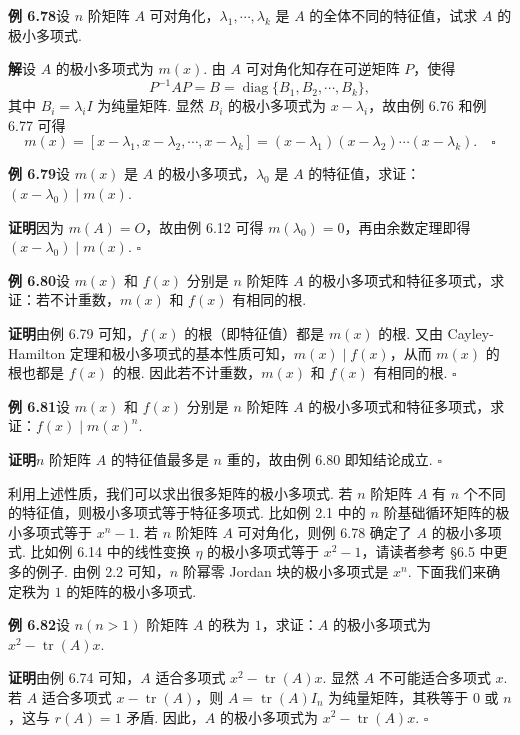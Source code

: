 \documentclass[UTF8, 12pt, fontset=fandol, oneside]{ctexart}
\begin{document}
\noindent\textbf{例 6.78}\quad 设 $n$ 阶矩阵 $A$ 可对角化，$\lambda_1,\cdots,\lambda_k$ 是 $A$ 的全体不同的特征值，试求 $A$ 的极小多项式.

\noindent\textbf{解}\quad 设 $A$ 的极小多项式为 $m(x)$. 由 $A$ 可对角化知存在可逆矩阵 $P$，使得
\[
P^{-1}AP=B=\operatorname{diag}\{B_1,B_2,\cdots,B_k\},
\]
其中 $B_i=\lambda_iI$ 为纯量矩阵. 显然 $B_i$ 的极小多项式为 $x-\lambda_i$，故由例 6.76 和例 6.77 可得
\[
m(x)=[x-\lambda_1,x-\lambda_2,\cdots,x-\lambda_k]=(x-\lambda_1)(x-\lambda_2)\cdots(x-\lambda_k). \quad \square
\]

\noindent\textbf{例 6.79}\quad 设 $m(x)$ 是 $A$ 的极小多项式，$\lambda_0$ 是 $A$ 的特征值，求证：$(x-\lambda_0)\mid m(x)$.

\noindent\textbf{证明}\quad 因为 $m(A)=O$，故由例 6.12 可得 $m(\lambda_0)=0$，再由余数定理即得 $(x-\lambda_0)\mid m(x)$. $\square$

\noindent\textbf{例 6.80}\quad 设 $m(x)$ 和 $f(x)$ 分别是 $n$ 阶矩阵 $A$ 的极小多项式和特征多项式，求证：若不计重数，$m(x)$ 和 $f(x)$ 有相同的根.

\noindent\textbf{证明}\quad 由例 6.79 可知，$f(x)$ 的根（即特征值）都是 $m(x)$ 的根. 又由 Cayley-Hamilton 定理和极小多项式的基本性质可知，$m(x)\mid f(x)$，从而 $m(x)$ 的根也都是 $f(x)$ 的根. 因此若不计重数，$m(x)$ 和 $f(x)$ 有相同的根. $\square$

\noindent\textbf{例 6.81}\quad 设 $m(x)$ 和 $f(x)$ 分别是 $n$ 阶矩阵 $A$ 的极小多项式和特征多项式，求证：$f(x)\mid m(x)^n$.

\noindent\textbf{证明}\quad $n$ 阶矩阵 $A$ 的特征值最多是 $n$ 重的，故由例 6.80 即知结论成立. $\square$

利用上述性质，我们可以求出很多矩阵的极小多项式. 若 $n$ 阶矩阵 $A$ 有 $n$ 个不同的特征值，则极小多项式等于特征多项式. 比如例 2.1 中的 $n$ 阶基础循环矩阵的极小多项式等于 $x^n-1$. 若 $n$ 阶矩阵 $A$ 可对角化，则例 6.78 确定了 $A$ 的极小多项式. 比如例 6.14 中的线性变换 $\eta$ 的极小多项式等于 $x^2-1$，请读者参考 \S 6.5 中更多的例子. 由例 2.2 可知，$n$ 阶幂零 Jordan 块的极小多项式是 $x^n$. 下面我们来确定秩为 $1$ 的矩阵的极小多项式.

\noindent\textbf{例 6.82}\quad 设 $n(n>1)$ 阶矩阵 $A$ 的秩为 $1$，求证：$A$ 的极小多项式为 $x^2-\operatorname{tr}(A)x$.

\noindent\textbf{证明}\quad 由例 6.74 可知，$A$ 适合多项式 $x^2-\operatorname{tr}(A)x$. 显然 $A$ 不可能适合多项式 $x$. 若 $A$ 适合多项式 $x-\operatorname{tr}(A)$，则 $A=\operatorname{tr}(A)I_n$ 为纯量矩阵，其秩等于 $0$ 或 $n$，这与 $r(A)=1$ 矛盾. 因此，$A$ 的极小多项式为 $x^2-\operatorname{tr}(A)x$. $\square$
\end{document}
